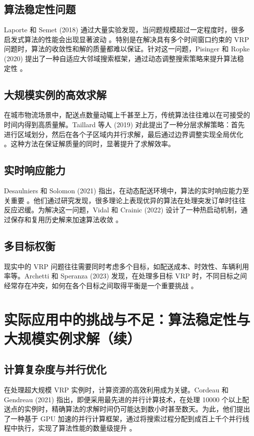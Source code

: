 \documentclass[12pt,a4paper,twoside]{ctexbook}
\begin{document}
\subsection{算法稳定性问题}
Laporte 和 Semet (2018) 通过大量实验发现，当问题规模超过一定程度时，很多启发式算法的性能会出现显著波动 \cite{12}。特别是在解决具有多个时间窗口约束的 VRP 问题时，算法的收敛性和解的质量都难以保证。针对这一问题，Pisinger 和 Ropke (2020) 提出了一种自适应大邻域搜索框架，通过动态调整搜索策略来提升算法稳定性 \cite{13}。

\subsection{大规模实例的高效求解}
在城市物流场景中，配送点数量动辄上千甚至上万，传统算法往往难以在可接受的时间内得到高质量解。Taillard 等人 (2019) 对此提出了一种分层求解策略：首先进行区域划分，然后在各个子区域内并行求解，最后通过边界调整实现全局优化 \cite{14}。这种方法在保证解质量的同时，显著提升了求解效率。

\subsection{实时响应能力}
Desaulniers 和 Solomon (2021) 指出，在动态配送环境中，算法的实时响应能力至关重要 \cite{15}。他们通过研究发现，很多理论上表现优异的算法在处理突发订单时往往反应迟缓。为解决这一问题，Vidal 和 Crainic (2022) 设计了一种热启动机制，通过保存和复用历史解来加速算法收敛 \cite{16}。

\subsection{多目标权衡}
现实中的 VRP 问题往往需要同时考虑多个目标，如配送成本、时效性、车辆利用率等。Archetti 和 Speranza (2023) 发现，在处理多目标 VRP 时，不同目标之间经常存在冲突，如何在各个目标之间取得平衡是一个重要挑战 \cite{17}。

\section{实际应用中的挑战与不足：算法稳定性与大规模实例求解（续）}

\subsection{计算复杂度与并行优化}
在处理超大规模 VRP 实例时，计算资源的高效利用成为关键。Cordeau 和 Gendreau (2021) 指出，即便采用最先进的并行计算技术，在处理 10000 个以上配送点的实例时，精确算法的求解时间仍可能达到数小时甚至数天。为此，他们提出了一种基于 GPU 加速的并行计算框架，通过将搜索过程分配到成百上千个并行线程中执行，实现了算法性能的数量级提升 \cite{18}。
\end{document}
